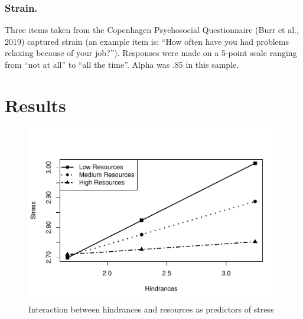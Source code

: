 \documentclass[
  man]{apa6}
\begin{document}
\hypertarget{strain.}{%
\subsubsection{Strain.}\label{strain.}}

Three items taken from the Copenhagen Psychosocial Questionnaire (Burr et al., 2019) captured strain (an example item is: ``How often have you had problems relaxing because of your job?''). Responses were made on a 5-point scale ranging from ``not at all'' to ``all the time''. Alpha was .85 in this sample.

\hypertarget{results}{%
\section{Results}\label{results}}

\begin{figure}
\centering
\includegraphics{SIOP_PROCESS_files/figure-latex/analyses-1.pdf}
\caption{\label{fig:analyses}Interaction between hindrances and resources as predictors of stress}
\end{figure}
\end{document}
